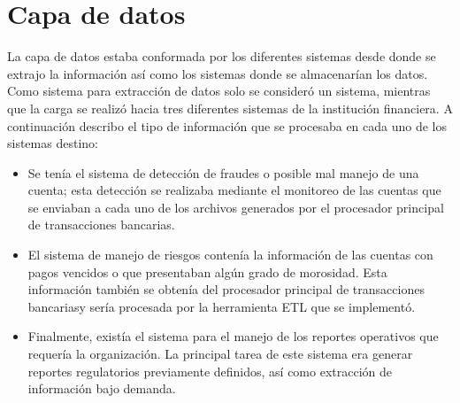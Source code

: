 \section{Capa de datos}

La capa de datos estaba conformada por los diferentes sistemas desde donde se
extrajo la información así como los sistemas donde se almacenarían los
datos. Como sistema para extracción de datos solo se consideró un sistema,
mientras que la carga se realizó hacia tres diferentes sistemas de la
institución financiera. A continuación describo el tipo de información que se
procesaba en cada uno de los sistemas destino:

\begin{itemize}

\item Se tenía el sistema de detección de fraudes o posible mal manejo de una
  cuenta; esta detección se realizaba mediante el monitoreo de las cuentas que
  se enviaban a cada uno de los archivos generados por el procesador principal
  de transacciones bancarias.

\item El sistema de manejo de riesgos contenía la información de las cuentas
  con pagos vencidos o que presentaban algún grado de morosidad. Esta
  información también se obtenía del procesador principal de transacciones
  bancariasy sería procesada por la herramienta ETL que se implementó.

\item Finalmente, existía el sistema para el manejo de los reportes operativos
  que requería la organización. La principal tarea de este sistema era generar
  reportes regulatorios previamente definidos, así como extracción de
  información bajo demanda.
\end{itemize}

\cleardoublepage

